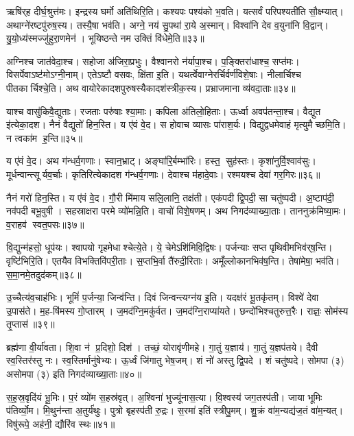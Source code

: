 ऋषि॑र्‌ह दीर्घ॒श्रुत्त॑मः। इन्द्रस्य घर्मो अति॑थिरि॒ति। 
कश्यपः पश्य॑को भ॒वति। यत्सर्वं परिपश्यती॑ति सौ॒क्ष्म्यात्‌। 
अथाग्ने॑रष्टपु॑रुष॒स्य। तस्यै॒षा भव॑ति। 
अग्ने॒ नय॑ सु॒पथा॑ रा॒ये अ॒स्मान्‌। विश्वा॑नि देव व॒युना॑नि वि॒द्वान्‌। 
यु॒यो॒ध्य॑स्मज्जु॑हुरा॒णमेन॑। भूयिष्ठन्ते नम उक्तिं वि॑धेमे॒ति॥३३॥\anuvakamend


अग्निश्च जात॑वेदा॒श्च। सहोजा अ॑जिरा॒प्रभुः। वैश्वानरो न॑र्यापा॒श्च। 
प॒ङ्क्तिरा॑धाश्च॒ सप्त॑मः। विसर्पेवाऽष्ट॑मोऽग्नी॒नाम्‌। 
एतेऽष्टौ वसवः, क्षि॑ता इ॒ति। यथर्त्वेवाग्नेरर्चिर्वर्ण॑विशे॒षाः। 
नीलार्चिश्च पीतकार्चिश्चे॒ति। अथ वायोरेकादशपुरुषस्यैकादश॑स्त्रीक॒स्य। 
प्रभ्राजमाना व्य॑वदा॒ताः॥३४॥


याश्च वासु॑किवै॒द्युताः। रजताः परु॑षाः श्या॒माः। कपिला अ॑तिलो॒हिताः। 
ऊर्ध्वा अवप॑तन्ता॒श्च। वैद्युत इ॑त्येका॒दश। नैनं वैद्युतो॑ हिन॒स्ति। 
य ए॑वं वे॒द। स होवाच व्यासः पा॑राश॒र्यः। 
विद्युद्वधमेवाहं मृत्युमैच्छमि॒ति। न त्वका॑म ह॒न्ति॥३५॥


य ए॑वं वे॒द। अथ ग॑न्धर्व॒गणाः। स्वान॒भ्राट्‌। 
अङ्घा॑रि॒र्बम्भा॑रिः। हस्त॒ सुह॑स्तः। कृशा॑नुर्वि॒श्वाव॑सुः। 
मूर्धन्वान्त्सूर्यव॒र्चाः। कृतिरित्येकादश ग॑न्धर्व॒गणाः। 
देवाश्च म॑हादे॒वाः। रश्मयश्च देवा॑ गर॒गिरः॥३६॥


नैनं गरो॑ हिन॒स्ति। य ए॑वं वे॒द। 
गौ॒री मि॑माय सलि॒लानि॒ तक्ष॑ती। एक॑पदी द्वि॒पदी॒ सा चतु॑ष्पदी। 
अ॒ष्टाप॑दी॒ नव॑पदी बभू॒वुषी। सहस्राक्षरा परमे व्यो॑मन्नि॒ति। 
वाचो॑ विशे॒षणम्‌। अथ निगद॑व्याख्या॒ताः। 
ताननुक्र॑मिष्या॒मः। व॒राहव॑ स्वत॒पसः॥३७॥

वि॒द्युन्म॑हसो॒ धूप॑यः। श्वापयो गृहमेधाश्चेत्ये॒ते। 
ये॒ चेमेऽशि॑मिवि॒\-द्विषः। पर्जन्याः सप्त पृथिवीमभिव॑र्‌ष॒न्ति। 
वृष्टि॑भिरि॒ति। एतयैव विभक्तिवि॑परी॒ताः। स॒प्तभि॒र्वा तै॑रुदी॒रिताः। 
अमूँल्लोकान\-भिव॑\ur{}ष॒न्ति। तेषा॑मेषा॒ भव॑ति। स॒मा॒नमे॒तदुद॑कम्‌॥३८॥

उ॒च्चैत्य॑व॒चाह॑भिः। भूमिं॑ प॒र्जन्या॒ जिन्व॑न्ति। दिवं जिन्वन्त्यग्न॑य इ॒ति। 
यदक्ष॑रं भू॒तकृ॑तम्‌। विश्वे॑ देवा उ॒पास॑ते। म॒ह\ur-\hspace{-0.5ex}\mbox{षि॑मस्य} गो॒प्तारम्। 
ज॒मद॑ग्नि॒मकु॑र्वत। ज॒मद॑ग्नि॒राप्या॑यते। 
छन्दो॑भिश्चतुरुत्त॒रैः। राज्ञः॒ सोम॑स्य तृ॒प्तास॑॥३९॥

ब्रह्म॑णा वी॒र्या॑वता। शि॒वा न॑ प्र॒दिशो॒ दिश॑। 
तच्छं॒ योरावृ॑णीमहे। गा॒तुं य॒ज्ञाय॑। गा॒तुं य॒ज्ञप॑तये। 
दैवी स्व॒स्तिर॑स्तु नः। स्व॒स्तिर्मानु॑षेभ्यः। ऊ॒र्ध्वं जि॑गातु भेष॒जम्। 
शं नो॑ अस्तु द्वि॒पदे। शं चतु॑ष्पदे। 
सोमपा (३) असोमपा (३) इति निगद॑व्याख्या॒ताः॥४०॥\anuvakamend


स॒ह॒स्र॒वृदि॑यं भू॒मिः। प॒रं व्यो॑म स॒हस्र॑वृत्‌। अ॒श्विना॑ भुज्यू॑नास॒त्या। 
वि॒श्वस्य॑ जग॒तस्प॑ती। जाया भूमिः प॑तिर्व्यो॒म। मि॒थुन॑न्ता अ॒तुर्य॑थुः। 
पुत्रो बृहस्प॑ती रु॒द्रः। स॒रमा॑ इति॑ स्त्रीपु॒मम्‌। 
शु॒क्रं वा॑म॒न्यद्य॑ज॒तं वा॑म॒न्यत्‌। विषु॑रूपे॒ अह॑नी॒ द्यौरि॑व स्थः॥४१॥



